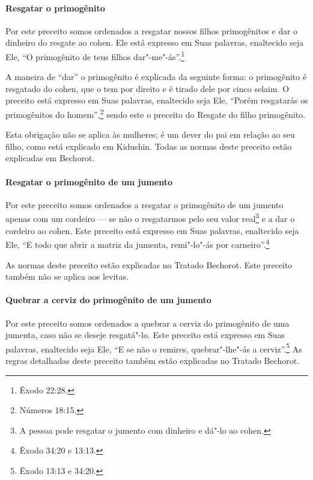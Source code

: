 \begin{multicols}{2}
\paragraph{Resgatar o primogênito}

Por este preceito somos ordenados a resgatar nossos filhos primogênitos
e dar o dinheiro do resgate ao cohen\starr. Ele está expresso em Suas
palavras, enaltecido seja Ele, ``O primogênito de teus filhos dar"-me"-ás''.\footnote{Êxodo 22:28.}

A maneira de ``dar'' o primogênito é explicada da seguinte forma: o
primogênito é resgatado do cohen\starr, que o tem por direito e é tirado
dele por cinco selaim\starr. O preceito está expresso em Suas palavras, enaltecido seja Ele, ``Porém
resgatarás os primogênitos do homem'',\footnote{Números 18:15.} sendo este o
preceito do Resgate do filho primogênito.

Esta obrigação não se aplica às mulheres; é um dever do pai em relação
ao seu filho, como está explicado em Kidushin\starr. Todas as normas deste
preceito estão explicadas em Bechorot\starr.

\paragraph{Resgatar o primogênito de um jumento}

Por este preceito somos ordenados a resgatar o primogênito de um jumento
apenas com um cordeiro --- se não o resgatarmos pelo seu valor
real\footnote{A pessoa pode resgatar o jumento com dinheiro e dá"-lo ao cohen\starr.} e a dar o cordeiro ao cohen\starr. Este
preceito está expresso em Suas palavras,
enaltecido seja Ele, ``E todo que abrir a matriz da jumenta, remi"-lo"-ás
por carneiro''.\footnote{Êxodo 34:20 e 13:13.}

As normas deste preceito estão explicadas no Tratado Bechorot\starr. Este
preceito também não se aplica aos levitas\starr.

\paragraph{Quebrar a cerviz do primogênito de um jumento}

Por este preceito somos ordenados a quebrar a cerviz do primogênito de
uma jumenta, caso não se deseje resgatá"-lo. Este preceito está expresso
em Suas palavras, enaltecido seja Ele, ``E se não o remires,
quebrar"-lhe"-ás a cerviz''.\footnote{Êxodo 13:13 e 34:20.} As regras detalhadas
deste preceito também estão explicadas no Tratado Bechorot\starr.


\end{multicols}
